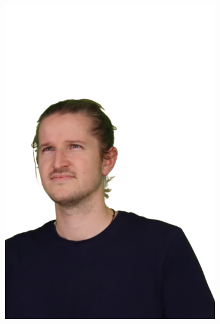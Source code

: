 \begin{figure}[!ht]
\begin{subfigure}{0.12\linewidth}
        \includegraphics[width=\textwidth]{Figures/results/initials/ephra/3_render.png}

\end{subfigure}
\end{figure}
